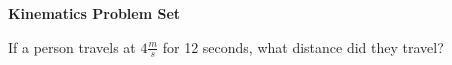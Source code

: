 \documentclass{exam}
\begin{document}
    \vspace*{-25px}
    \begin{center}
        \huge \textbf{Kinematics Problem Set}
    \end{center}
    \vspace*{0.05in}
    \begin{questions}
        \large
        \question If a person travels at $4 \frac{m}{s}$ for 12 seconds, what distance did they travel?
    \end{questions}
\end{document}
